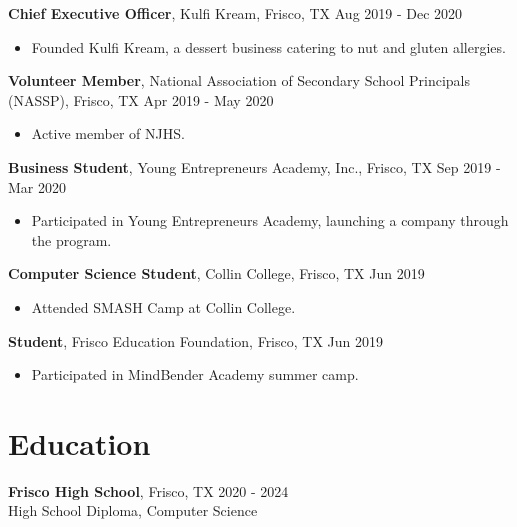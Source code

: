 \documentclass[a4paper, 10pt]{article}
\begin{document}
\vspace{12pt}

\textbf{Chief Executive Officer}, Kulfi Kream, Frisco, TX \hfill Aug 2019 - Dec 2020
\begin{itemize}[left=0pt, itemsep=0pt]
    \item Founded Kulfi Kream, a dessert business catering to nut and gluten allergies.
\end{itemize}

\vspace{12pt}

\textbf{Volunteer Member}, National Association of Secondary School Principals (NASSP), Frisco, TX \hfill Apr 2019 - May 2020
\begin{itemize}[left=0pt, itemsep=0pt]
    \item Active member of NJHS.
\end{itemize}

\vspace{12pt}

\textbf{Business Student}, Young Entrepreneurs Academy, Inc., Frisco, TX \hfill Sep 2019 - Mar 2020
\begin{itemize}[left=0pt, itemsep=0pt]
    \item Participated in Young Entrepreneurs Academy, launching a company through the program.
\end{itemize}

\vspace{12pt}

\textbf{Computer Science Student}, Collin College, Frisco, TX \hfill Jun 2019
\begin{itemize}[left=0pt, itemsep=0pt]
    \item Attended SMASH Camp at Collin College.
\end{itemize}

\vspace{12pt}

\textbf{Student}, Frisco Education Foundation, Frisco, TX \hfill Jun 2019
\begin{itemize}[left=0pt, itemsep=0pt]
    \item Participated in MindBender Academy summer camp.
\end{itemize}

\section*{Education}
\textbf{Frisco High School}, Frisco, TX \hfill 2020 - 2024 \\
High School Diploma, Computer Science
\end{document}
